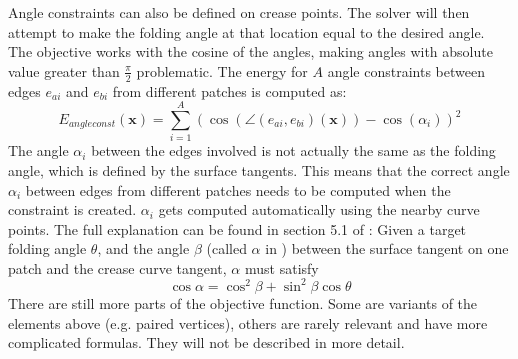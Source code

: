 \documentclass[a4paper,twoside,12pt,nochapterprefix]{scrbook}
\begin{document}
Angle constraints can also be defined on crease points. The solver will then attempt to make the folding angle at that location equal to the desired angle. The objective works with the cosine of the angles, making angles with absolute value greater than $\frac{\pi}{2}$ problematic. The energy for $A$ angle constraints between edges $e_{ai}$ and $e_{bi}$ from different patches is computed as:
\begin{equation}
E_{angleconst}(\mathbf{x}) = \sum_{i = 1}^A (\cos( \angle(e_{ai}, e_{bi})(\mathbf{x})) - \cos(\alpha_i ))^2
\end{equation}
The angle $\alpha_i$ between the edges involved is not actually the same as the folding angle, which is defined by the surface tangents. This means that the correct angle $\alpha_i$ between edges from different patches needs to be computed when the constraint is created. $\alpha_i$ gets computed automatically using the nearby curve points. The full explanation can be found in section 5.1 of \cite{Rabinovich:CurvedFolds:2019}: Given a target folding angle $\theta$, and the angle $\beta$ (called $\alpha$ in \cite{Rabinovich:CurvedFolds:2019}) between the surface tangent on one patch and the crease curve tangent, $\alpha$ must satisfy
\begin{equation}
\cos{\alpha}= \cos^2 \beta + \sin^2 \beta \cos \theta
\end{equation}
There are still more parts of the objective function. Some are variants of the elements above (e.g. paired vertices), others are rarely relevant and have more complicated formulas. They will not be described in more detail.\newline
\end{document}
